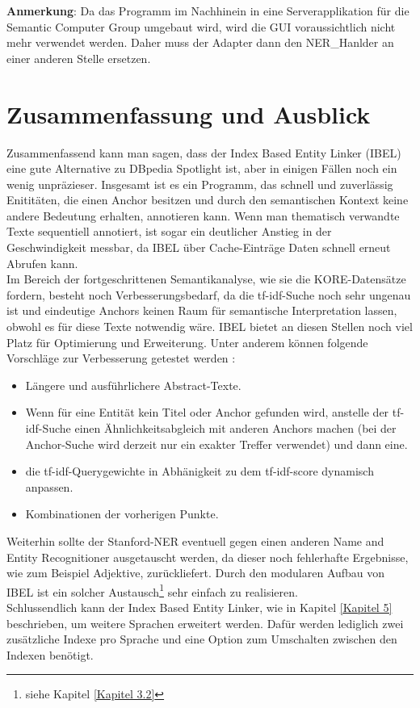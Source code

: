 \documentclass[11pt, a4paper, oneside]{Thesis} %
\begin{document}
\textbf{Anmerkung}: Da das Programm im Nachhinein in eine Serverapplikation f\"ur die Semantic Computer Group umgebaut wird, wird die GUI voraussichtlich nicht mehr verwendet werden. Daher muss der Adapter dann den NER\_Hanlder an einer anderen Stelle ersetzen.

\chapter{Zusammenfassung und Ausblick}
Zusammenfassend kann man sagen, dass der Index Based Entity Linker (IBEL) eine gute Alternative zu DBpedia Spotlight ist, aber in einigen F\"allen noch ein wenig unpr\"azieser. Insgesamt ist es ein Programm, das schnell und zuverl\"assig Enitit\"aten, die einen Anchor besitzen und durch den semantischen Kontext keine andere Bedeutung erhalten, annotieren kann. Wenn man thematisch verwandte Texte sequentiell annotiert, ist sogar ein deutlicher Anstieg in der Geschwindigkeit messbar, da IBEL \"uber Cache-Eintr\"age Daten schnell erneut Abrufen kann. \\
Im Bereich der fortgeschrittenen Semantikanalyse, wie sie die KORE-Datens\"atze fordern, besteht noch Verbesserungsbedarf, da die tf-idf-Suche noch sehr ungenau ist und eindeutige Anchors keinen Raum f\"ur semantische Interpretation lassen, obwohl es f\"ur diese Texte notwendig w\"are. IBEL bietet an diesen Stellen noch viel Platz f\"ur Optimierung und Erweiterung. Unter anderem k\"onnen folgende Vorschl\"age zur Verbesserung getestet werden :
\begin{itemize}
\item L\"angere und ausf\"uhrlichere Abstract-Texte.
\item Wenn f\"ur eine Entit\"at kein Titel oder Anchor gefunden wird, anstelle der tf-idf-Suche einen \"Ahnlichkeitsabgleich mit anderen Anchors machen (bei der Anchor-Suche wird derzeit nur ein exakter Treffer verwendet) und dann eine.
\item die tf-idf-Querygewichte in Abh\"anigkeit zu dem tf-idf-score dynamisch anpassen.
\item Kombinationen der vorherigen Punkte.
\end{itemize}
Weiterhin sollte der Stanford-NER eventuell gegen einen anderen Name and Entity Recognitioner ausgetauscht werden, da dieser noch fehlerhafte Ergebnisse, wie zum Beispiel Adjektive, zur\"uckliefert. Durch den modularen Aufbau von IBEL ist ein solcher Austausch\footnote{siehe Kapitel \ref{Kapitel 3.2}} sehr einfach zu realisieren.\\
Schlussendlich kann der Index Based Entity Linker, wie in Kapitel \ref{Kapitel 5} beschrieben, um weitere Sprachen erweitert werden. Daf\"ur werden lediglich zwei zus\"atzliche Indexe pro Sprache und eine Option zum Umschalten zwischen den Indexen ben\"otigt.
\end{document}
